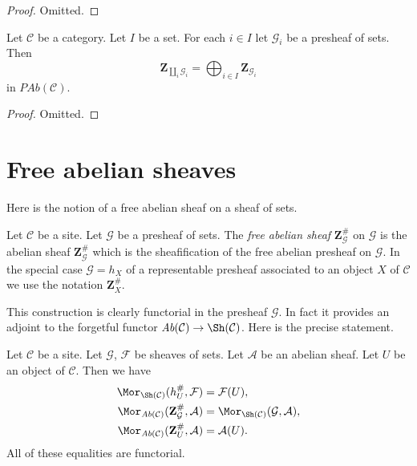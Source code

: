 \begin{proof}
Omitted.
\end{proof}

\begin{lemma}
\label{lemma-coproduct-sum-free-abelian-presheaf}
Let $\mathcal{C}$ be a category.
Let $I$ be a set. For each $i \in I$ let
$\mathcal{G}_i$ be a presheaf of sets.
Then
$$
\mathbf{Z}_{\coprod_i \mathcal{G}_i}
=
\bigoplus\nolimits_{i \in I} \mathbf{Z}_{\mathcal{G}_i}
$$
in $\textit{PAb}(\mathcal{C})$.
\end{lemma}

\begin{proof}
Omitted.
\end{proof}



\section{Free abelian sheaves}
\label{section-free-abelian-sheaf}

\noindent
Here is the notion of a free abelian sheaf on a sheaf of sets.

\begin{definition}
\label{definition-free-abelian-sheaf-on}
Let $\mathcal{C}$ be a site. Let $\mathcal{G}$ be a presheaf of sets.
The {\it free abelian sheaf} $\mathbf{Z}_\mathcal{G}^\#$
on $\mathcal{G}$ is the abelian sheaf $\mathbf{Z}_\mathcal{G}^\#$
which is the sheafification of the free abelian presheaf on $\mathcal{G}$.
In the special case $\mathcal{G} = h_X$ of a representable presheaf
associated to an object $X$ of $\mathcal{C}$
we use the notation $\mathbf{Z}_X^\#$.
\end{definition}

\noindent
This construction is clearly functorial in the presheaf $\mathcal{G}$.
In fact it provides an adjoint to the forgetful functor
$\textit{Ab}(\mathcal{C}) \to \Sh(\mathcal{C})$.
Here is the precise statement.

\begin{lemma}
\label{lemma-obvious-adjointness-sheaves}
Let $\mathcal{C}$ be a site.
Let $\mathcal{G}$, $\mathcal{F}$ be sheaves of sets.
Let $\mathcal{A}$ be an abelian sheaf.
Let $U$ be an object of $\mathcal{C}$. Then
we have
\begin{align*}
\Mor_{\Sh(\mathcal{C})}(h_U^\#, \mathcal{F})
& =
\mathcal{F}(U), \\
\Mor_{\textit{Ab}(\mathcal{C})}(\mathbf{Z}_\mathcal{G}^\#,
\mathcal{A})
& =
\Mor_{\Sh(\mathcal{C})}(\mathcal{G}, \mathcal{A}), \\
\Mor_{\textit{Ab}(\mathcal{C})}(\mathbf{Z}_U^\#, \mathcal{A})
& =
\mathcal{A}(U).
\end{align*}
All of these equalities are functorial.
\end{lemma}

